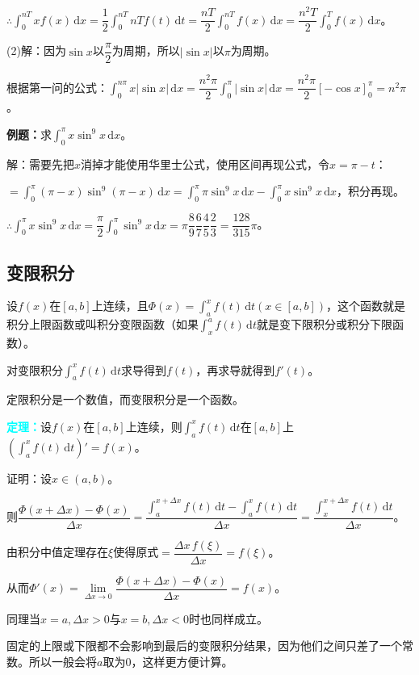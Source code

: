 \documentclass[UTF8, 12pt]{ctexart}
\begin{document}
$\therefore\int_0^{nT}xf(x)\,\textrm{d}x=\dfrac{1}{2}\int_0^{nT}nTf(t)\,\textrm{d}t=\dfrac{nT}{2}\int_0^{nT}f(x)\,\textrm{d}x=\dfrac{n^2T}{2}\int_0^Tf(x)\,\textrm{d}x$。

(2)解：因为$\sin x$以$\dfrac{\pi}{2}$为周期，所以$\vert\sin x\vert$以$\pi$为周期。

根据第一问的公式：$\int_0^{n\pi}x\vert\sin x\vert\,\textrm{d}x=\dfrac{n^2\pi}{2}\int_0^\pi\vert\sin x\vert\,\textrm{d}x=\dfrac{n^2\pi}{2}[-\cos x]_0^\pi=n^2\pi$。

\textbf{例题：}求$\int_0^\pi x\sin^9x\,\textrm{d}x$。

解：需要先把$x$消掉才能使用华里士公式，使用区间再现公式，令$x=\pi-t$：

$=\int_0^\pi(\pi-x)\sin^9(\pi-x)\,\textrm{d}x=\int_0^\pi\pi\sin^9x\,\textrm{d}x-\int_0^\pi x\sin^9x\,\textrm{d}x$，积分再现。

$\therefore\int_0^\pi x\sin^9x\,\textrm{d}x=\dfrac{\pi}{2}\int_0^\pi\sin^9x\,\textrm{d}x=\pi\dfrac{8}{9}\dfrac{6}{7}\dfrac{4}{5}\dfrac{2}{3}=\dfrac{128}{315}\pi$。

\subsection{变限积分}

设$f(x)$在$[a,b]$上连续，且$\Phi(x)=\int_a^xf(t)\,\textrm{d}t(x\in[a,b])$，这个函数就是积分上限函数或叫积分变限函数（如果$\int_x^af(t)\,\textrm{d}t$就是变下限积分或积分下限函数）。

对变限积分$\int_{a}^xf(t)\,\textrm{d}t$求导得到$f(t)$，再求导就得到$f'(t)$。

定限积分是一个数值，而变限积分是一个函数。

\textcolor{aqua}{\textbf{定理：}}设$f(x)$在$[a,b]$上连续，则$\int_a^xf(t)\,\textrm{d}t$在$[a,b]$上$(\int_a^xf(t)\,\textrm{d}t)'=f(x)$。

证明：设$x\in(a,b)$。

则$\dfrac{\Phi(x+\Delta x)-\Phi(x)}{\Delta x}=\dfrac{\int_a^{x+\Delta x}f(t)\,\textrm{d}t-\int_a^xf(t)\,\textrm{d}t}{\Delta x}=\dfrac{\int_x^{x+\Delta x}f(t)\,\textrm{d}t}{\Delta x}$。

由积分中值定理存在$\xi$使得原式$=\dfrac{\Delta x\,f(\xi)}{\Delta x}=f(\xi)$。

从而$\Phi'(x)=\lim\limits_{\Delta x\to 0}\dfrac{\Phi(x+\Delta x)-\Phi(x)}{\Delta x}=f(x)$。

同理当$x=a,\Delta x>0$与$x=b,\Delta x<0$时也同样成立。

固定的上限或下限都不会影响到最后的变限积分结果，因为他们之间只差了一个常数。所以一般会将$a$取为0，这样更方便计算。
\end{document}
